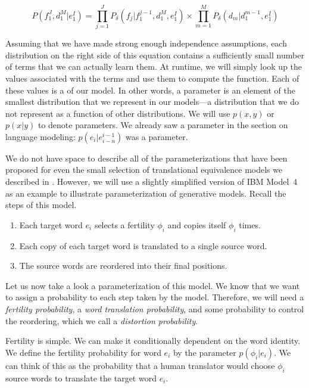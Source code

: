 \begin{equation}
	P(f_1^J,d_1^M|e_1^I) = \prod_{j=1}^J P_\delta(f_j|f_1^{j-1},d_1^M,e_1^I) \times
	\prod_{m=1}^M P_\delta(d_m|d_1^{m-1},e_1^I) 
\end{equation} 

\noindent Assuming that we have made strong enough
independence assumptions, each distribution on the right
side of this equation 
contains a sufficiently small number of terms that we 
can actually learn them.  At runtime,
we will simply look up the values associated with
the terms and use them to compute the function.
Each of these values is a  of our model.
In other words, a parameter is an element of the 
smallest distribution that we represent in
our models---a distribution that we do not represent
as a function of other distributions. We will use 
$p(x,y)$ or $p(x|y)$ to denote parameters.  We already
saw a parameter in the section on language modeling:
$p(e_i|e_{i-n}^{i-1})$ was a parameter.

We do not have space to describe all of the 
parameterizations that have been proposed for 
even the small selection of translational equivalence
models we described in .  
However, we will use a slightly simplified version of
IBM Model~4 as an example to illustrate parameterization of generative
models.  Recall the steps of this model.

\begin{enumerate}
	\item Each target word $e_i$ selects a fertility $\phi_i$ and copies itself $\phi_i$ times.
	\item Each copy of each target word is translated to a single source word.
	\item The source words are reordered into their final positions.
\end{enumerate}

Let us now take a look a parameterization of this model.  We know that
we want to assign a probability to each step taken by the model.  Therefore,
we will need a {\em fertility probability}, a {\em word translation probability},
and some probability to control the reordering, which we call a {\em distortion
probability}.

Fertility is simple.  We can make it conditionally
dependent on the word identity.  We define the
fertility probability for word $e_i$ 
by the parameter $p(\phi_i|e_i)$.  We can think of
this as the probability that a human translator
would choose $\phi_i$ source words to translate the 
target word $e_i$.

